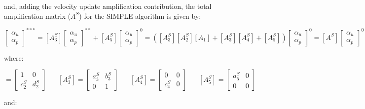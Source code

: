 \documentclass[final,3p,times,11pt,onecolumn]{myElsarticle}
\numberwithin{equation}{section}
\begin{document}
\noindent and, adding the velocity update amplification contribution, the total amplification matrix ($A^S$) for the SIMPLE algorithm is given by:

\begin{equation}
\begin{bmatrix}
\alpha_u \\
\alpha_p 
\end{bmatrix}^{***} =
[A^S_3]
\begin{bmatrix}
\alpha_u \\
\alpha_p 
\end{bmatrix}^{**} +
[A^S_5]
\begin{bmatrix}
\alpha_u \\
\alpha_p 
\end{bmatrix}^{0} =
([A^S_3] [A^S_2] [A_1] + [A^S_3] [A^S_4] + [A^S_5])
\begin{bmatrix}
\alpha_u \\
\alpha_p 
\end{bmatrix}^{0} =
[A^S]
\begin{bmatrix}
\alpha_u \\
\alpha_p 
\end{bmatrix}^{0} 
\end{equation}

\noindent where:

\begin{equation}
[A^S_2]= 
\begin{bmatrix}
1 & 0 \\
c^S_2 & d^S_2
\end{bmatrix}
\; \; \; \; \; \;
[A^S_3]= 
\begin{bmatrix}
a^S_3 & b^S_3 \\
0 & 1
\end{bmatrix}
\; \; \; \; \; \;
[A^S_4]= 
\begin{bmatrix}
0 & 0 \\
c^S_4 & 0
\end{bmatrix}
\; \; \; \; \; \;
[A^S_5]= 
\begin{bmatrix}
a^S_5 & 0 \\
0 & 0
\end{bmatrix}
\end{equation}

\noindent and:
\end{document}
